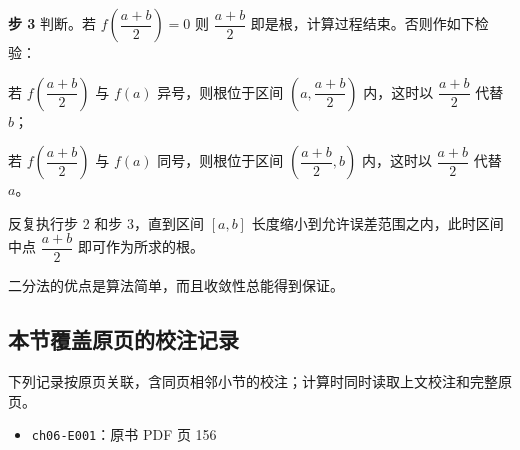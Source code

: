 \documentclass[
  10pt,
  fontset=fandol]{ctexart}
\providecommand{\tightlist}{%
  \setlength{\itemsep}{0pt}\setlength{\parskip}{0pt}}
\begin{document}
\textbf{步 3} 判断。若 \(f\left(\dfrac{a+b}{2}\right)=0\) 则 \(\dfrac{a+b}{2}\) 即是根，计算过程结束。否则作如下检验：

若 \(f\left(\dfrac{a+b}{2}\right)\) 与 \(f(a)\) 异号，则根位于区间 \(\left(a,\dfrac{a+b}{2}\right)\) 内，这时以 \(\dfrac{a+b}{2}\) 代替 \(b\)；

若 \(f\left(\dfrac{a+b}{2}\right)\) 与 \(f(a)\) 同号，则根位于区间 \(\left(\dfrac{a+b}{2},b\right)\) 内，这时以 \(\dfrac{a+b}{2}\) 代替 \(a\)。

反复执行步 2 和步 3，直到区间 \([a,b]\) 长度缩小到允许误差范围之内，此时区间中点 \(\dfrac{a+b}{2}\) 即可作为所求的根。

二分法的优点是算法简单，而且收敛性总能得到保证。

\subsection{本节覆盖原页的校注记录}\label{ux672cux8282ux8986ux76d6ux539fux9875ux7684ux6821ux6ce8ux8bb0ux5f55}

下列记录按原页关联，含同页相邻小节的校注；计算时同时读取上文校注和完整原页。

\begin{itemize}
\tightlist
\item
  \texttt{ch06-E001}：原书 PDF 页 156
\end{itemize}
\end{document}

